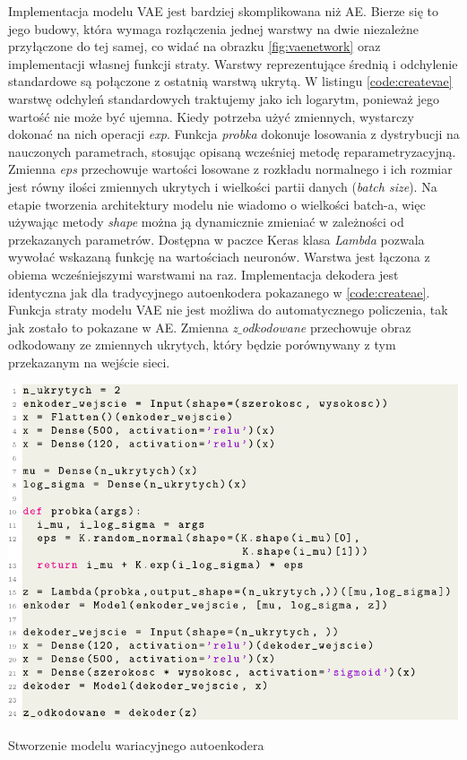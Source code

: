 \documentclass[a4paper,12pt,oneside]{book} %
\begin{document}
Implementacja modelu VAE jest bardziej skomplikowana niż AE. Bierze się to jego budowy, która wymaga rozłączenia jednej warstwy na dwie niezależne przyłączone do tej samej, co widać na obrazku \ref{fig:vaenetwork} oraz implementacji własnej funkcji straty. Warstwy reprezentujące średnią i odchylenie standardowe są połączone z ostatnią warstwą ukrytą. W listingu \ref{code:createvae} warstwę odchyleń standardowych traktujemy jako ich logarytm, ponieważ jego wartość nie może być ujemna. Kiedy potrzeba użyć zmiennych, wystarczy dokonać na nich operacji \textit{exp}. Funkcja \textit{probka} dokonuje losowania z dystrybucji na nauczonych parametrach, stosując opisaną wcześniej metodę reparametryzacyjną. Zmienna \textit{eps} przechowuje wartości losowane z rozkładu normalnego i ich rozmiar jest równy ilości zmiennych ukrytych i wielkości partii danych (\textit{batch size}). Na etapie tworzenia architektury modelu nie wiadomo o wielkości batch-a, więc używając metody \textit{shape} można ją dynamicznie zmieniać w zależności od przekazanych parametrów. Dostępna w paczce Keras klasa \textit{Lambda} pozwala wywołać wskazaną funkcję na wartościach neuronów. Warstwa jest łączona z obiema wcześniejszymi warstwami na raz. Implementacja dekodera jest identyczna jak dla tradycyjnego autoenkodera pokazanego w \ref{code:createae}. Funkcja straty modelu VAE nie jest możliwa do automatycznego policzenia, tak jak zostało to pokazane w AE. Zmienna \textit{z$\_$odkodowane} przechowuje obraz odkodowany ze zmiennych ukrytych, który będzie porównywany z tym przekazanym na wejście sieci.

\begin{code}[h!]
	\centering
	\includegraphics[width=\linewidth]{modelvae.pdf}
	\caption{Stworzenie modelu wariacyjnego autoenkodera}
	\label{code:createvae}
\end{code}
\end{document}
